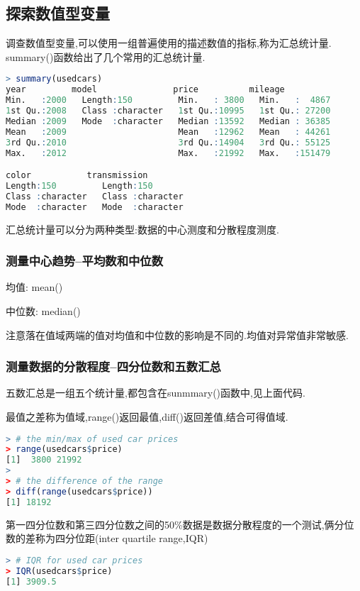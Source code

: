 \documentclass[11pt,a4paper,oneside]{book}
\begin{document}
\subsection{探索数值型变量}
调查数值型变量,可以使用一组普遍使用的描述数值的指标,称为汇总统计量. summary()函数给出了几个常用的汇总统计量.

\begin{lstlisting}[language=r]
> summary(usedcars)
year         model               price          mileage      
Min.   :2000   Length:150         Min.   : 3800   Min.   :  4867  
1st Qu.:2008   Class :character   1st Qu.:10995   1st Qu.: 27200  
Median :2009   Mode  :character   Median :13592   Median : 36385  
Mean   :2009                      Mean   :12962   Mean   : 44261  
3rd Qu.:2010                      3rd Qu.:14904   3rd Qu.: 55125  
Max.   :2012                      Max.   :21992   Max.   :151479  

color           transmission      
Length:150         Length:150        
Class :character   Class :character  
Mode  :character   Mode  :character  
\end{lstlisting}

汇总统计量可以分为两种类型:数据的中心测度和分散程度测度.
\subsubsection{测量中心趋势--平均数和中位数}
均值: mean()

中位数: median()

\begin{tcolorbox}[colback=pink!10!white,colframe=pink!100!black]
注意落在值域两端的值对均值和中位数的影响是不同的.均值对异常值非常敏感.
\end{tcolorbox}

\subsubsection{测量数据的分散程度--四分位数和五数汇总}
五数汇总是一组五个统计量,都包含在sunmmary()函数中,见上面代码.

最值之差称为值域,range()返回最值,diff()返回差值,结合可得值域.
\begin{lstlisting}[language=r]
> # the min/max of used car prices
> range(usedcars$price)
[1]  3800 21992
> 
> # the difference of the range
> diff(range(usedcars$price))
[1] 18192
\end{lstlisting}

第一四分位数和第三四分位数之间的50\%数据是数据分散程度的一个测试,俩分位数的差称为四分位距(inter quartile range,IQR)
\begin{lstlisting}[language=r]
> # IQR for used car prices
> IQR(usedcars$price)
[1] 3909.5
\end{lstlisting}
\end{document}

